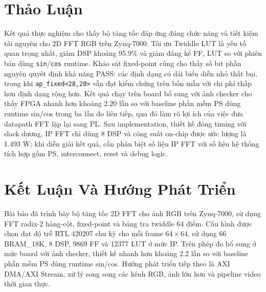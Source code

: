 ﻿\documentclass[conference]{IEEEtran}
\begin{document}
\section{Thảo Luận}
\label{sec:discussion}
Kết quả thực nghiệm cho thấy bộ tăng tốc đáp ứng đúng chức năng và tiết kiệm tài nguyên cho 2D FFT RGB trên Zynq-7000. Tối ưu Twiddle LUT là yếu tố quan trọng nhất, giảm DSP khoảng 95.9\% và giảm đáng kể FF, LUT so với phiên bản dùng \texttt{sin}/\texttt{cos} runtime. Khảo sát fixed-point cũng cho thấy số bit phần nguyên quyết định khả năng PASS: các định dạng có dải biểu diễn nhỏ thất bại, trong khi \texttt{ap\_fixed<28,20>} vẫn đạt kiểm chứng trên bốn mẫu với chi phí thấp hơn định dạng rộng hơn. Kết quả chạy trên board bổ sung với ảnh checker cho thấy FPGA nhanh hơn khoảng 2.20 lần so với baseline phần mềm PS dùng runtime sin/cos trong ba lần đo liên tiếp, qua đó làm rõ lợi ích của việc đưa datapath FFT lặp lại sang PL. Sau implementation, thiết kế đóng timing với slack dương, IP FFT chỉ dùng 8 DSP và công suất on-chip được ước lượng là 1.493 W; khi diễn giải kết quả, cần phân biệt số liệu IP FFT với số liệu hệ thống tích hợp gồm PS, interconnect, reset và debug logic.

\section{Kết Luận Và Hướng Phát Triển}
\label{sec:conclusion}
Bài báo đã trình bày bộ tăng tốc 2D FFT cho ảnh RGB trên Zynq-7000, sử dụng FFT radix-2 hàng-cột, fixed-point và bảng tra twiddle 64 điểm. Cấu hình được chọn đạt độ trễ RTL 420207 chu kỳ cho mỗi frame $64\times64$, sử dụng 66 BRAM\_18K, 8 DSP, 9869 FF và 12377 LUT ở mức IP. Trên phép đo bổ sung ở mức board với ảnh checker, thiết kế nhanh hơn khoảng 2.2 lần so với baseline phần mềm PS dùng runtime sin/cos. Hướng phát triển tiếp theo là AXI DMA/AXI Stream, xử lý song song các kênh RGB, ảnh lớn hơn và pipeline video thời gian thực.

{\fontsize{5.9}{6.35}\selectfont
    
    
}
\end{document}
